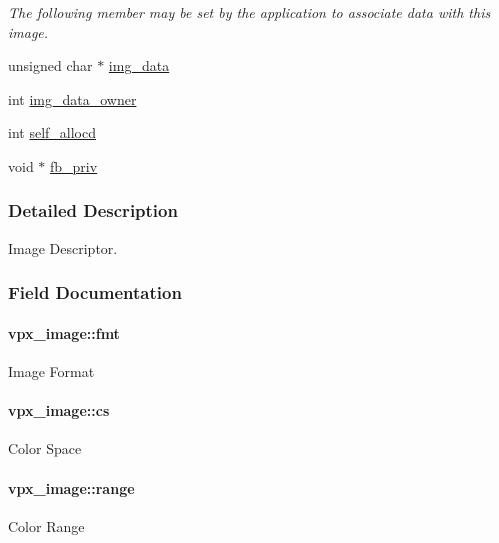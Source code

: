 \begin{DoxyCompactItemize}
\begin{DoxyCompactList}\small\item\em The following member may be set by the application to associate data with this image. \end{DoxyCompactList}\item 
unsigned char $\ast$ \hyperlink{structvpx__image_a3c9b7a7a68e4a9665b47433a1e96d78b}{img\+\_\+data}
\item 
int \hyperlink{structvpx__image_a4d2c8d41b67f7d3f3114212a8d8afdce}{img\+\_\+data\+\_\+owner}
\item 
int \hyperlink{structvpx__image_a33e8c75d8efc5d4f389e8fc09283a4cc}{self\+\_\+allocd}
\item 
void $\ast$ \hyperlink{structvpx__image_a4b138b7d146dc75ef5d8947d421b0533}{fb\+\_\+priv}
\end{DoxyCompactItemize}


\subsubsection{Detailed Description}
Image Descriptor. 

\subsubsection{Field Documentation}
\paragraph[{\texorpdfstring{fmt}{fmt}}]{ vpx\+\_\+image\+::fmt}\hypertarget{structvpx__image_a1d734f8afa9200a21c2d9f6bcf8c04d8}{}\label{structvpx__image_a1d734f8afa9200a21c2d9f6bcf8c04d8}
Image Format 
\paragraph[{\texorpdfstring{cs}{cs}}]{ vpx\+\_\+image\+::cs}\hypertarget{structvpx__image_a8fda4fb8430e4cede2a4ee7d28dd0a6c}{}\label{structvpx__image_a8fda4fb8430e4cede2a4ee7d28dd0a6c}
Color Space 
\paragraph[{\texorpdfstring{range}{range}}]{ vpx\+\_\+image\+::range}\hypertarget{structvpx__image_af451ddd9be4cf49958e253a2b8dd12a9}{}\label{structvpx__image_af451ddd9be4cf49958e253a2b8dd12a9}
Color Range 
